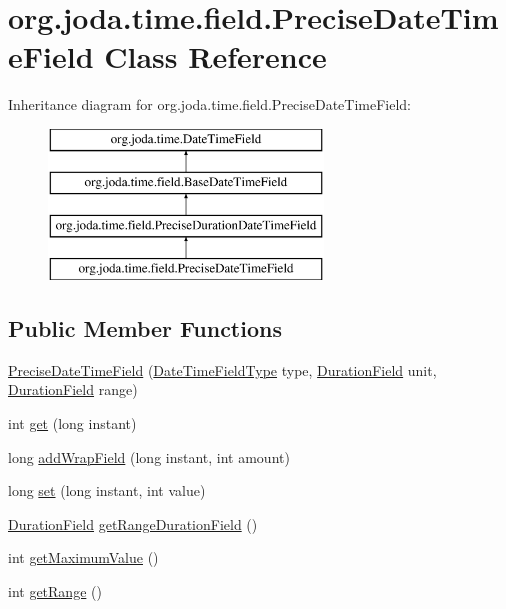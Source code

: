 \hypertarget{classorg_1_1joda_1_1time_1_1field_1_1_precise_date_time_field}{\section{org.\-joda.\-time.\-field.\-Precise\-Date\-Time\-Field Class Reference}
\label{classorg_1_1joda_1_1time_1_1field_1_1_precise_date_time_field}
}
Inheritance diagram for org.\-joda.\-time.\-field.\-Precise\-Date\-Time\-Field\-:\begin{figure}[H]
\begin{center}
\leavevmode
\includegraphics[height=4.000000cm]{classorg_1_1joda_1_1time_1_1field_1_1_precise_date_time_field}
\end{center}
\end{figure}
\subsection*{Public Member Functions}
\begin{DoxyCompactItemize}
\item 
\hyperlink{classorg_1_1joda_1_1time_1_1field_1_1_precise_date_time_field_aa217155343fdc80a328607b818dbfed1}{Precise\-Date\-Time\-Field} (\hyperlink{classorg_1_1joda_1_1time_1_1_date_time_field_type}{Date\-Time\-Field\-Type} type, \hyperlink{classorg_1_1joda_1_1time_1_1_duration_field}{Duration\-Field} unit, \hyperlink{classorg_1_1joda_1_1time_1_1_duration_field}{Duration\-Field} range)
\item 
int \hyperlink{classorg_1_1joda_1_1time_1_1field_1_1_precise_date_time_field_ae0dd25539a104e1aeba64b80efff08e8}{get} (long instant)
\item 
long \hyperlink{classorg_1_1joda_1_1time_1_1field_1_1_precise_date_time_field_a54576a067bf5bc5239a4da8ddaf02e07}{add\-Wrap\-Field} (long instant, int amount)
\item 
long \hyperlink{classorg_1_1joda_1_1time_1_1field_1_1_precise_date_time_field_ac6b9ef0c99c5980725f7b30ff1944bd3}{set} (long instant, int value)
\item 
\hyperlink{classorg_1_1joda_1_1time_1_1_duration_field}{Duration\-Field} \hyperlink{classorg_1_1joda_1_1time_1_1field_1_1_precise_date_time_field_a7dcea30fbc36269c1364909062f5dff3}{get\-Range\-Duration\-Field} ()
\item 
int \hyperlink{classorg_1_1joda_1_1time_1_1field_1_1_precise_date_time_field_a77b2aa4c9f1adfc64a6bd8c8b8605cce}{get\-Maximum\-Value} ()
\item 
int \hyperlink{classorg_1_1joda_1_1time_1_1field_1_1_precise_date_time_field_aad3eddc8f8f2f7dcaf4c4bc2aae3d9ed}{get\-Range} ()
\end{DoxyCompactItemize}
